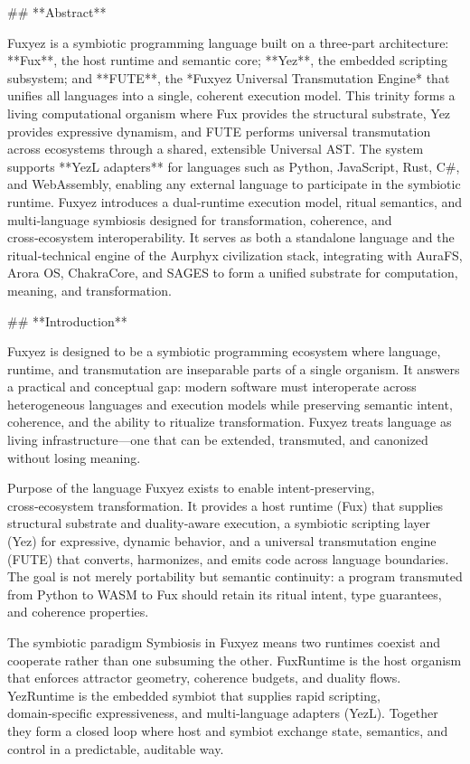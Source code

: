 ## **Abstract**

Fuxyez is a symbiotic programming language built on a three‑part architecture: **Fux**, the host runtime and semantic core; **Yez**, the embedded scripting subsystem; and **FUTE**, the *Fuxyez Universal Transmutation Engine* that unifies all languages into a single, coherent execution model. This trinity forms a living computational organism where Fux provides the structural substrate, Yez provides expressive dynamism, and FUTE performs universal transmutation across ecosystems through a shared, extensible Universal AST. The system supports **YezL adapters** for languages such as Python, JavaScript, Rust, C#, and WebAssembly, enabling any external language to participate in the symbiotic runtime. Fuxyez introduces a dual‑runtime execution model, ritual semantics, and multi‑language symbiosis designed for transformation, coherence, and cross‑ecosystem interoperability. It serves as both a standalone language and the ritual‑technical engine of the Aurphyx civilization stack, integrating with AuraFS, Arora OS, ChakraCore, and SAGES to form a unified substrate for computation, meaning, and transformation.

## **Introduction**

Fuxyez is designed to be a symbiotic programming ecosystem where language, runtime, and transmutation are inseparable parts of a single organism. It answers a practical and conceptual gap: modern software must interoperate across heterogeneous languages and execution models while preserving semantic intent, coherence, and the ability to ritualize transformation. Fuxyez treats language as living infrastructure—one that can be extended, transmuted, and canonized without losing meaning.

Purpose of the language
Fuxyez exists to enable intent‑preserving, cross‑ecosystem transformation. It provides a host runtime (Fux) that supplies structural substrate and duality‑aware execution, a symbiotic scripting layer (Yez) for expressive, dynamic behavior, and a universal transmutation engine (FUTE) that converts, harmonizes, and emits code across language boundaries. The goal is not merely portability but semantic continuity: a program transmuted from Python to WASM to Fux should retain its ritual intent, type guarantees, and coherence properties.

The symbiotic paradigm
Symbiosis in Fuxyez means two runtimes coexist and cooperate rather than one subsuming the other. FuxRuntime is the host organism that enforces attractor geometry, coherence budgets, and duality flows. YezRuntime is the embedded symbiot that supplies rapid scripting, domain‑specific expressiveness, and multi‑language adapters (YezL). Together they form a closed loop where host and symbiot exchange state, semantics, and control in a predictable, auditable way.

